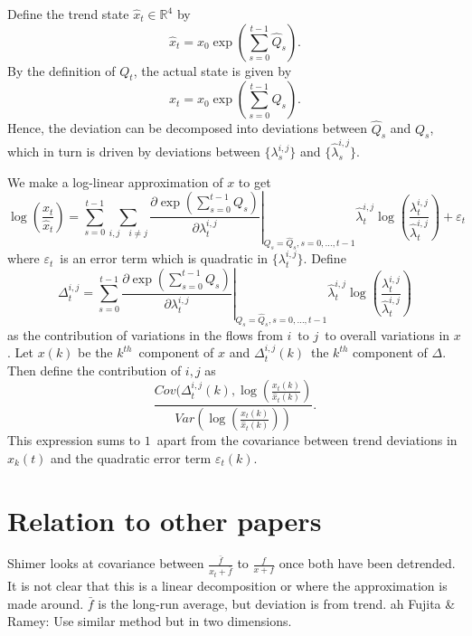 Define the trend state $\hat{x}_t \in \mathbb{R}^4$ by
\[
\hat{x}_t=x_0\exp\left(\sum_{s=0}^{t-1} \hat{Q}_s\right).
\]
By the definition of $Q_t$, the actual state is given by
\[
x_t=x_0\exp\left(\sum_{s=0}^{t-1} Q_s\right).
\]
Hence, the deviation can be decomposed into deviations between $\hat{Q}_s$ and $Q_s$, which in turn is driven by deviations between $\{\lambda^{i,j}_s\}$ and $\{\hat{\lambda}^{i,j}_s\}$. 

We make a log-linear approximation of $x$ to get 
\[
\log\left(\frac{x_t}{\hat{x}_t}\right) = \sum_{s=0}^{t-1} \sum_{i,j \quad i\neq j} \left.\frac{\partial \exp(\sum_{s=0}^{t-1} Q_s)}{\partial \lambda^{i,j}_t}\right|_{Q_s=\hat{Q}_s, s=0,\dots, t-1} \hat{\lambda}^{i,j}_t \log\left(\frac{\lambda_t^{i,j}}{\hat{\lambda}^{i,j}_t}\right)+\varepsilon_t
\]
where $\varepsilon_t$ is an error term which is quadratic in $\{\lambda^{i,j}_t\}$. Define
\[
\Delta^{i,j}_t = \sum_{s=0}^{t-1} \left.\frac{\partial \exp(\sum_{s=0}^{t-1} Q_s)}{\partial \lambda^{i,j}_t}\right|_{Q_s=\hat{Q}_s, s=0,\dots, t-1} \hat{\lambda}^{i,j}_t \log\left(\frac{\lambda_t^{i,j}}{\hat{\lambda}^{i,j}_t}\right)
\]
as the contribution of variations in the flows from $i$ to $j$ to overall variations in $x$. Let $x(k)$ be the $k^{th}$ component of $x$ and $\Delta^{i,j}_t(k)$ the $k^{th}$ component of $\Delta$. Then define the contribution of $i,j$ as
\[
\frac{Cov(\Delta^{i,j}_t(k),\log\left(\frac{x_t(k)}{\hat{x}_t(k)}\right)}{Var\left(\log\left(\frac{x_t(k)}{\hat{x}_t(k)}\right)\right)}.
\]
This expression sums to $1$ apart from the covariance between trend deviations in $x_k(t)$ and the quadratic error term $\varepsilon_t(k)$. 


\section{Relation to other papers}
Shimer looks at covariance between $\frac{\bar{f}}{x_t+\bar{f}}$ to $\frac{f}{x+f}$ once both have been detrended. It is not clear that this is a linear decomposition or where the approximation is made around. $\bar{f}$ is the long-run average, but deviation is from trend.
ah
Fujita \& Ramey: Use similar method but in two dimensions.
